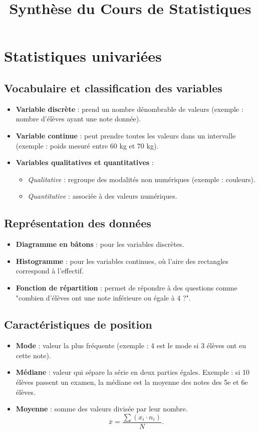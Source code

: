 \documentclass[a4paper,12pt]{article}
\title{Synthèse du Cours de Statistiques}
\author{}
\date{}
\begin{document}
\maketitle

\section*{Statistiques univariées}

\subsection*{Vocabulaire et classification des variables}
\begin{itemize}
    \item \textbf{Variable discrète} : prend un nombre dénombrable de valeurs (exemple : nombre d’élèves ayant une note donnée).
    \item \textbf{Variable continue} : peut prendre toutes les valeurs dans un intervalle (exemple : poids mesuré entre 60 kg et 70 kg).
    \item \textbf{Variables qualitatives et quantitatives} :
    \begin{itemize}
        \item \textit{Qualitative} : regroupe des modalités non numériques (exemple : couleurs).
        \item \textit{Quantitative} : associée à des valeurs numériques.
    \end{itemize}
\end{itemize}

\subsection*{Représentation des données}
\begin{itemize}
    \item \textbf{Diagramme en bâtons} : pour les variables discrètes.
    \item \textbf{Histogramme} : pour les variables continues, où l’aire des rectangles correspond à l’effectif.
    \item \textbf{Fonction de répartition} : permet de répondre à des questions comme "combien d’élèves ont une note inférieure ou égale à 4 ?".
\end{itemize}

\subsection*{Caractéristiques de position}
\begin{itemize}
    \item \textbf{Mode} : valeur la plus fréquente (exemple : 4 est le mode si 3 élèves ont eu cette note).
    \item \textbf{Médiane} : valeur qui sépare la série en deux parties égales. Exemple : si 10 élèves passent un examen, la médiane est la moyenne des notes des 5e et 6e élèves.
    \item \textbf{Moyenne} : somme des valeurs divisée par leur nombre.
    \[
    \bar{x} = \frac{\sum (x_i \cdot n_i)}{N}.
    \]
\end{itemize}
\end{document}
